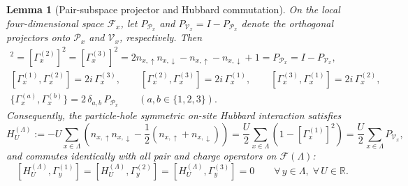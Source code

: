 \documentclass[11pt]{article}
\newtheorem{lemma}[theorem]{Lemma}
\theoremstyle{definition}
\theoremstyle{remark}
\newcommand{\calF}{\mathcal{F}}
\newcommand{\calP}{\mathcal{P}}
\newcommand{\calV}{\mathcal{V}}
\newcommand{\bbR}{\mathbb{R}}
\begin{document}
\begin{lemma}[Pair-subspace projector and Hubbard commutation]\label{lem:pair-algebra}
On the local four-dimensional space $\calF_x$, let $P_{\calP_x}$ and $P_{\calV_x} = I - P_{\calP_x}$ denote the orthogonal projectors onto $\calP_x$ and $\calV_x$, respectively. Then
\begin{gather}
[\Gamma_x^{(1)}]^2 = [\Gamma_x^{(2)}]^2 = [\Gamma_x^{(3)}]^2 = 2 n_{x,\uparrow} n_{x,\downarrow} - n_{x,\uparrow} - n_{x,\downarrow} + 1 = P_{\calP_x} = I - P_{\calV_x}, \label{eq:proj-id}\\
[\Gamma_x^{(1)}, \Gamma_x^{(2)}] = 2i\,\Gamma_x^{(3)}, \qquad [\Gamma_x^{(2)}, \Gamma_x^{(3)}] = 2i\,\Gamma_x^{(1)}, \qquad [\Gamma_x^{(3)}, \Gamma_x^{(1)}] = 2i\,\Gamma_x^{(2)}, \label{eq:su2-comm}\\
\{\Gamma_x^{(a)}, \Gamma_x^{(b)}\} = 2\,\delta_{a,b}\,P_{\calP_x} \qquad (a,b \in \{1,2,3\}). \label{eq:pauli-anticomm}
\end{gather}
Consequently, the particle-hole symmetric on-site Hubbard interaction satisfies
\begin{equation}\label{eq:hubbard-id}
H_U^{(\Lambda)} := -U \sum_{x \in \Lambda} \left(n_{x,\uparrow} n_{x,\downarrow} - \frac{1}{2}(n_{x,\uparrow} + n_{x,\downarrow})\right) = \frac{U}{2} \sum_{x \in \Lambda} \left(1 - [\Gamma_x^{(1)}]^2\right) = \frac{U}{2} \sum_{x \in \Lambda} P_{\calV_x},
\end{equation}
and commutes identically with all pair and charge operators on $\calF(\Lambda)$:
\begin{equation}\label{eq:hubbard-comm}
[H_U^{(\Lambda)}, \Gamma_y^{(1)}] = [H_U^{(\Lambda)}, \Gamma_y^{(2)}] = [H_U^{(\Lambda)}, \Gamma_y^{(3)}] = 0 \qquad \forall\, y \in \Lambda,\;\forall\, U \in \bbR.
\end{equation}
\end{lemma}
\end{document}
